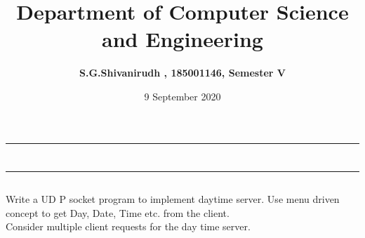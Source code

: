 \documentclass[12pt,letterpaper]{article}
\title{\textbf{Department of Computer Science and Engineering}}
\author{\textbf{S.G.Shivanirudh , 185001146, Semester V }}
\date{9 September 2020}
\begin{document}
\maketitle
\hrule
\section*{}
\hrule 
\bigskip\bigskip

\subsection*{}

\subsection*{}
\begin{flushleft}
Write a UD P socket program to implement daytime server. Use menu driven concept to get Day, Date, Time etc. from the client.\\
Consider multiple client requests for the day time server.
\end{flushleft}

\subsection*{}
\subsubsection*{}
\begin{flushleft}

\end{flushleft}

\subsubsection*{}
\begin{flushleft}

\end{flushleft}

\subsection*{}
\end{document}
